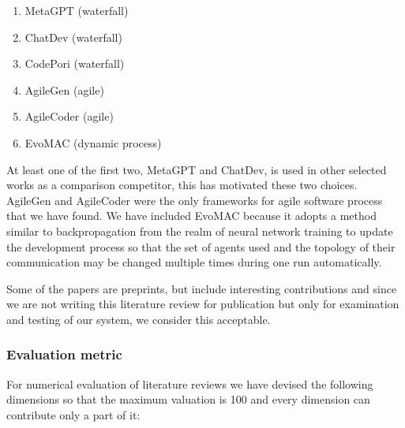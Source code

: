 \begin{enumerate}
	\item MetaGPT \cite{hong2024metagptmetaprogrammingmultiagent}  (waterfall)
	\item ChatDev \cite{qian2024chatdevcommunicativeagentssoftware} (waterfall)
	\item CodePori \cite{rasheed2024codeporilargescaleautonomoussoftware} (waterfall) 
	\item AgileGen \cite{zhang2024empoweringagilebasedgenerativesoftware} (agile)
	\item AgileCoder \cite{nguyen2024agilecoderdynamiccollaborativeagents} (agile)
	\item EvoMAC \cite{hu2024selfevolvingmultiagentcollaborationnetworks} (dynamic process)
\end{enumerate}

At least one of the first two, MetaGPT and ChatDev, is used in other selected works as a comparison competitor, this has motivated these two choices. AgileGen and AgileCoder were the only frameworks for agile software process that we have found. We have included EvoMAC because it adopts a method similar to backpropagation from the realm of neural network training to update the development process so that the set of agents used and the topology of their communication may be changed multiple times during one run automatically.


Some of the papers are preprints, but include interesting contributions and since we are not writing this literature review for publication but only for examination and testing of our system, we consider this acceptable.

\subsubsection{Evaluation metric}

For numerical evaluation of literature reviews we have devised the following dimensions so that the maximum valuation is 100 and every dimension can contribute only a part of it:



